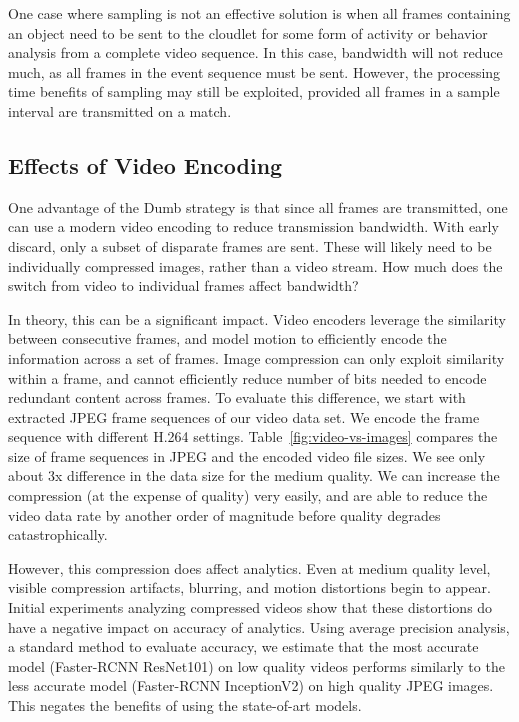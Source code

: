 One case where sampling is not an effective solution is when all frames
containing an object need to be sent to the cloudlet for some form of activity
or behavior analysis from a complete video sequence.  In this case, bandwidth
will not reduce much, as all frames in the event sequence must be sent.
However, the processing time benefits of sampling may still be exploited,
provided all frames in a sample interval are transmitted on a match.


\subsection{Effects of Video Encoding}

One advantage of the Dumb strategy is that since all
frames are transmitted, one can use a modern video encoding to
reduce transmission bandwidth.  With early discard, only a subset
of disparate frames are sent.  These will likely need to be
individually compressed images, rather than a video stream.  How
much does the switch from video to individual frames affect
bandwidth?

In theory, this can be a significant impact. Video encoders leverage the
similarity between consecutive frames, and model motion to efficiently encode
the information across a set of frames. Image compression can only exploit
similarity within a frame, and cannot efficiently reduce number of bits needed
to encode redundant content across frames. To evaluate this difference, we start
with extracted JPEG frame sequences of our video data set. We encode the frame
sequence with different H.264 settings. Table~\ref{fig:video-vs-images}
compares the size of frame sequences in JPEG and the encoded video file sizes.
We see only about 3x difference in the data size for the medium quality. We can
increase the compression (at the expense of quality) very easily, and are able
to reduce the video data rate by another order of magnitude before quality
degrades catastrophically.

However, this compression does affect analytics. Even at medium quality level,
visible compression artifacts, blurring, and motion distortions begin to appear.
Initial experiments analyzing compressed videos show that these distortions do
have a negative impact on accuracy of analytics. Using average precision
analysis, a standard method to evaluate accuracy, we estimate that the
most accurate model (Faster-RCNN ResNet101) on low quality videos performs similarly
to the less accurate model (Faster-RCNN InceptionV2) on high quality
JPEG images. This negates the benefits of using the state-of-art models.

